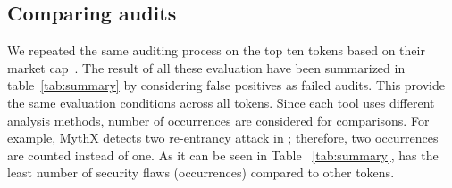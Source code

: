 
\subsection{Comparing audits}
We repeated the same auditing process on the top ten tokens based on their market cap~\cite{EtherScan}. The result of all these evaluation have been summarized in table~\ref{tab:summary} by considering false positives as failed audits. This provide the same evaluation conditions across all tokens. Since each tool uses different analysis methods, number of occurrences are considered for comparisons. For example, MythX detects two re-entrancy attack in \sys; therefore, two occurrences are counted instead of one. As it can be seen in Table ~\ref{tab:summary}, \sys has the least number of security flaws (occurrences) compared to other tokens.



